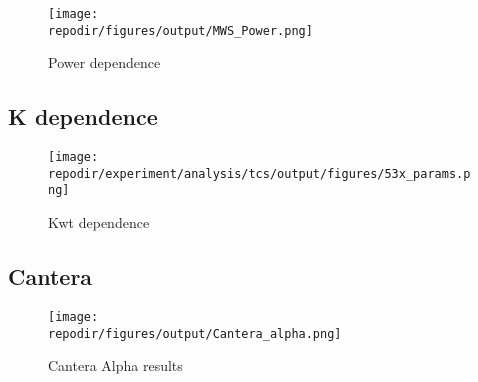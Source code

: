 \begin{figure}[h]
    \texttt{[image: \\repodir/figures/output/MWS\_Power.png]} 
    \caption{Power dependence}
    \label{fig:power_dependence}
\end{figure}


\subsection{K dependence}

\begin{figure}[h]
    \texttt{[image: \\repodir/experiment/analysis/tcs/output/figures/53x\_params.png]} 
    \caption{Kwt dependence}
    \label{fig:kwt_dependence}
\end{figure}


\subsection{Cantera}

\begin{figure}[h]
    \texttt{[image: \\repodir/figures/output/Cantera\_alpha.png]} 
    \caption{Cantera Alpha results}
\end{figure}
